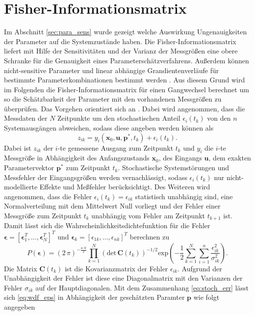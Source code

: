 \section{Fisher-Informationsmatrix}\label{sec:FiIn}
Im Abschnitt \ref{sec:para_sens} wurde gezeigt welche Auswirkung Ungenauigkeiten der Parameter auf die Systemzustände haben. Die Fisher-Informationsmatrix liefert mit Hilfe der Sensitivitäten und der Varianz der Messgrößen eine obere Schranke für die Genauigkeit eines Parameterschätzverfahrens. Außerdem können nicht-sensitive Parameter und linear abhängige Grandientenverläufe für bestimmte Parameterkombinationen bestimmt werden \cite{Majer.1998}. Aus diesem Grund wird im Folgenden die Fisher-Informationsmatrix für einen Gangwechsel berechnet um so die Schätzbarkeit der Parameter mit den vorhandenen Messgrößen zu überprüfen. Das Vorgehen orientiert sich an \cite{Majer.1998}. Dabei wird angenommen, dass die Messdaten der $N$ Zeitpunkte um den stochastischen Anteil $\epsilon_i(t_k)$ von den $n$ Systemausgängen abweichen, sodass diese angeben werden können als
\begin{equation}\label{eq:stoch_err}
z_{ik} = y_i(\pmb{x}_0,\pmb{u},\pmb{p}^*,t_k) + \epsilon_i(t_k).
\end{equation}
Dabei ist $z_{ik}$ der $i$-te gemessene Ausgang zum Zeitpunkt $t_k$ und $y_i$ die $i$-te Messgröße in Abhängigkeit des Anfangszustands $\pmb{x}_0$, des Eingangs $\pmb{u}$, dem exakten Parametervektor $\pmb{p}^*$ zum Zeitpunkt $t_k$. Stochastische Systemstörungen und Messfehler der Eingangsgrößen werden vernachlässigt, sodass $\epsilon_i(t_k)$ nur nicht-modellierte Effekte und Meßfehler berücksichtigt. Des Weiteren wird angenommen, dass die Fehler  $\epsilon_i(t_k) = \epsilon_{ik}$ statistisch unabhängig sind, eine Normalverteilung mit dem Mittelwert Null vorliegt und der Fehler einer Messgröße zum Zeitpunkt $t_k$ unabhängig vom Fehler am Zeitpunkt $t_{k+1}$ ist. Damit lässt sich die Wahrscheinlichkeitsdichtefunktion für die Fehler $\pmb{\epsilon} = [\pmb{\epsilon}_1^T,\dots,\pmb{\epsilon}_N^T]^T$ und $\pmb{\epsilon}_k = [\epsilon_{1k},\dots,\epsilon_{nk}]^T$ berechnen zu
\begin{equation}\label{eq:wdf_eps}
P(\pmb{\epsilon}) = (2\, \pi)^{-\frac{n\,N}{2}}\prod^N_{k=1}\left(\mathrm{det}\,\pmb{C}(t_k)\right)^{-1/2}\mathrm{exp}\left(-\frac{1}{2}\sum^N_{k=1}\sum^n_{i=1}\frac{\epsilon^2_{ik}}{\sigma^2_{ik}}\right).
\end{equation}
Die Matrix $\pmb{C}(t_k)$ ist die Kovarianzmatrix der Fehler $\epsilon_{ik}$. Aufgrund der Unabhängigkeit der Fehler ist diese eine Diagonalmatrix mit den Varianzen der Fehler $\sigma_{ik}$ auf der Hauptdiagonalen. Mit dem Zusammenhang \eqref{eq:stoch_err} lässt sich \eqref{eq:wdf_eps} in Abhängigkeit der geschätzten Paramter $\pmb{p}$ wie folgt angegeben
